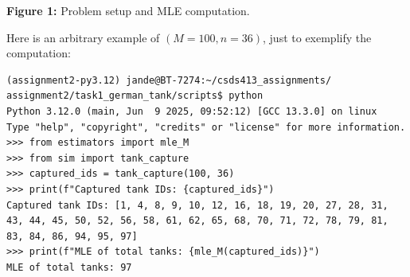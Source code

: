 \begin{center}
\textbf{Figure 1:} Problem setup and MLE computation.
\end{center}

Here is an arbitrary example of $( M=100, n=36 )$, just to exemplify the computation:

{\small
\begin{verbatim}
(assignment2-py3.12) jande@BT-7274:~/csds413_assignments/
assignment2/task1_german_tank/scripts$ python
Python 3.12.0 (main, Jun  9 2025, 09:52:12) [GCC 13.3.0] on linux
Type "help", "copyright", "credits" or "license" for more information.
>>> from estimators import mle_M
>>> from sim import tank_capture
>>> captured_ids = tank_capture(100, 36)
>>> print(f"Captured tank IDs: {captured_ids}")
Captured tank IDs: [1, 4, 8, 9, 10, 12, 16, 18, 19, 20, 27, 28, 31, 
43, 44, 45, 50, 52, 56, 58, 61, 62, 65, 68, 70, 71, 72, 78, 79, 81, 
83, 84, 86, 94, 95, 97]
>>> print(f"MLE of total tanks: {mle_M(captured_ids)}")
MLE of total tanks: 97
\end{verbatim}
}

\newpage
